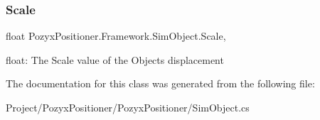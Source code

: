 \subsubsection{\texorpdfstring{Scale}{Scale}}
{\footnotesize\ttfamily float Pozyx\+Positioner.\+Framework.\+Sim\+Object.\+Scale\hspace{0.3cm}{\ttfamily [get]}, {\ttfamily [set]}}



float\+: The Scale value of the Object\textquotesingle{}s displacement 



The documentation for this class was generated from the following file\+:\begin{DoxyCompactItemize}
\item 
Project/\+Pozyx\+Positioner/\+Pozyx\+Positioner/Sim\+Object.\+cs\end{DoxyCompactItemize}
